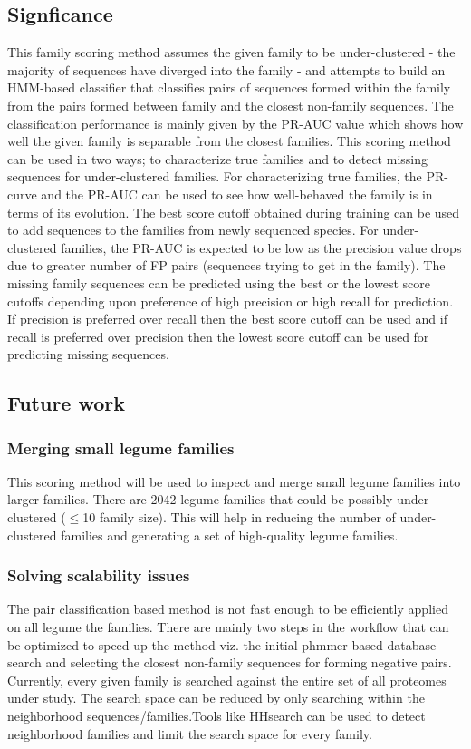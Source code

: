 \documentclass{article}
\begin{document}
		\subsection{Signficance}
		This family scoring method assumes the given family to be under-clustered - the majority of sequences have diverged into the family - and attempts to build an HMM-based classifier that classifies pairs of sequences formed within the family from the pairs formed between family and the closest non-family sequences. The classification performance is mainly given by the PR-AUC value which shows how well the given family is separable from the closest families. This scoring method can be used in two ways; to characterize true families and to detect missing sequences for under-clustered families. For characterizing true families, the PR-curve and the PR-AUC can be used to see how well-behaved the family is in terms of its evolution. The best score cutoff obtained during training can be used to add sequences to the families from newly sequenced species. For under-clustered families, the PR-AUC is expected to be low as the precision value drops due to greater number of FP pairs (sequences trying to get in the family). The missing family sequences can be predicted using the best or the lowest score cutoffs depending upon preference of  high precision or high recall for prediction. If precision is preferred over recall then the best score cutoff can be used and if recall is preferred over precision then the lowest score cutoff can be used for predicting missing sequences.
		
		\subsection{Future work}
			\subsubsection{Merging small legume families}
			This scoring method will be used to inspect and merge small legume families into larger families. There are 2042 legume families that could be possibly under-clustered ($\leq$10 family size). This will help in reducing the number of under-clustered families and generating a set of high-quality legume families.
			
			\subsubsection{Solving scalability issues}
			The pair classification based method is not fast enough to be efficiently applied on all legume the families. There are mainly two steps in the workflow that can be optimized to speed-up the method viz. the initial phmmer based database search and selecting the closest non-family sequences for forming negative pairs. Currently, every given family is searched against the entire set of all proteomes under study. The search space can be reduced by only searching within the neighborhood sequences/families.Tools like HHsearch \citep{soding2004protein} can be used to detect neighborhood families and limit the search space for every family. 
			
\end{document}
